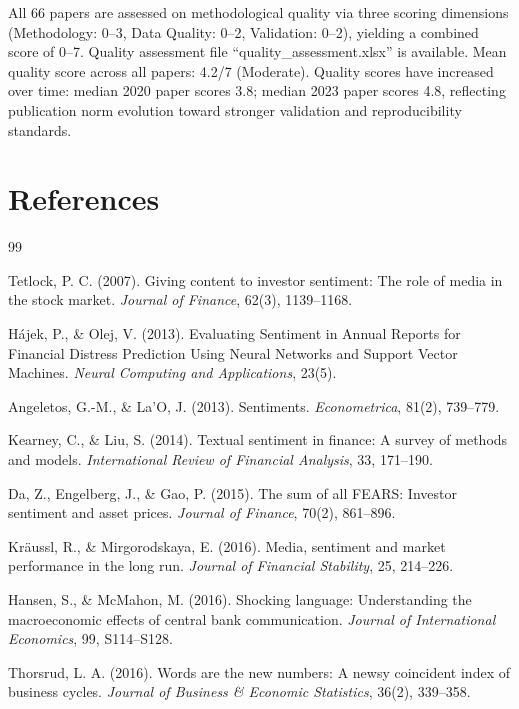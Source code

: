 \documentclass[11pt]{article}
\begin{document}
All 66 papers are assessed on methodological quality via three scoring dimensions (Methodology: 0--3, Data Quality: 0--2, Validation: 0--2), yielding a combined score of 0--7. Quality assessment file ``quality\_assessment.xlsx'' is available. Mean quality score across all papers: 4.2/7 (Moderate). Quality scores have increased over time: median 2020 paper scores 3.8; median 2023 paper scores 4.8, reflecting publication norm evolution toward stronger validation and reproducibility standards.

\newpage
\section*{References}

\begin{thebibliography}{99}

 Tetlock, P. C. (2007). Giving content to investor sentiment: The role of media in the stock market. \textit{Journal of Finance}, 62(3), 1139--1168.

 Hájek, P., \& Olej, V. (2013). Evaluating Sentiment in Annual Reports for Financial Distress Prediction Using Neural Networks and Support Vector Machines. \textit{Neural Computing and Applications}, 23(5).

 Angeletos, G.-M., \& La'O, J. (2013). Sentiments. \textit{Econometrica}, 81(2), 739--779.

 Kearney, C., \& Liu, S. (2014). Textual sentiment in finance: A survey of methods and models. \textit{International Review of Financial Analysis}, 33, 171--190.

 Da, Z., Engelberg, J., \& Gao, P. (2015). The sum of all FEARS: Investor sentiment and asset prices. \textit{Journal of Finance}, 70(2), 861--896.

 Kräussl, R., \& Mirgorodskaya, E. (2016). Media, sentiment and market performance in the long run. \textit{Journal of Financial Stability}, 25, 214--226.

 Hansen, S., \& McMahon, M. (2016). Shocking language: Understanding the macroeconomic effects of central bank communication. \textit{Journal of International Economics}, 99, S114--S128.

 Thorsrud, L. A. (2016). Words are the new numbers: A newsy coincident index of business cycles. \textit{Journal of Business \& Economic Statistics}, 36(2), 339--358.


\end{thebibliography}
\end{document}
